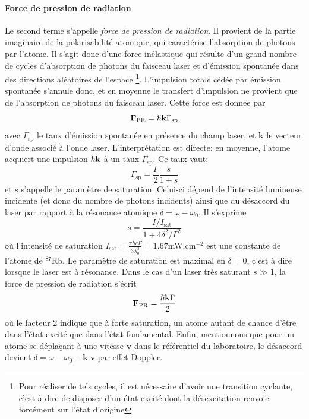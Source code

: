 \paragraph*{Force de pression de radiation}
Le second terme s'appelle \emph{force de pression de radiation}. Il provient de la partie imaginaire de la polarisabilité atomique, qui caractérise l'absorption de photons par l'atome. Il s'agit donc d'une force inélastique qui résulte d'un grand nombre de cycles d'absorption de photons du faisceau laser et d'émission spontanée dans des directions aléatoires de l'espace \footnote{Pour réaliser de tels cycles, il est nécessaire d'avoir une transition cyclante, c'est à dire de disposer d'un état excité dont la désexcitation renvoie forcément sur l'état d'origine}. L'impulsion totale cédée par émission spontanée s'annule donc, et en moyenne le transfert d'impulsion ne provient que de l'absorption de photons du faisceau laser. Cette force est donnée par
\begin{equation}
\mathbf{F}_{\mathrm{PR}}=\hslash \mathbf{k} \Gamma_{\mathrm{sp}} 
\end{equation}
avec $\Gamma_{\mathrm{sp}}$ le taux d'émission spontanée en présence du champ laser, et $\mathbf{k}$ le vecteur d'onde associé à l'onde laser. L'interprétation est directe: en moyenne, l'atome acquiert une impulsion $\hslash \mathbf{k}$ à un taux $\Gamma_{\mathrm{sp}}$. Ce taux vaut:
\begin{equation}
\Gamma_{\mathrm{sp}}=\frac{\Gamma}{2} \frac{s}{1+s}
\end{equation}
et $s$ s'appelle le paramètre de saturation. Celui-ci dépend de l'intensité lumineuse incidente (et donc du nombre de photons incidents) ainsi que du désaccord du laser par rapport à la résonance atomique $\delta = \omega-\omega_0$. Il s'exprime
\begin{equation}
s=\frac{I/I_{\mathrm{sat}}}{1+4\delta^2/\Gamma^2}
\end{equation}
où l'intensité de saturation $I_{\mathrm{sat}}=\frac{\pi h c \Gamma}{3\lambda_0^3}=1.67$mW.cm${}^{-2}$ est une constante de l'atome de ${}^{87}$Rb. Le paramètre de saturation est maximal en $\delta=0$, c'est à dire lorsque le laser est à résonance. Dans le cas d'un laser très saturant $s \gg 1$, la force de pression de radiation s'écrit
\begin{equation}
\mathbf{F}_{\mathrm{PR}}=\frac{\hslash \mathbf{k} \Gamma}{2}
\end{equation}
où le facteur 2 indique que à forte saturation, un atome autant de chance d'être dans l'état excité que dans l'état fondamental. Enfin, mentionnons que pour un atome se déplaçant à une vitesse $\mathbf{v}$ dans le référentiel du laboratoire, le désaccord devient $\delta=\omega-\omega_0-\mathbf{k}.\mathbf{v}$ par effet Doppler.


